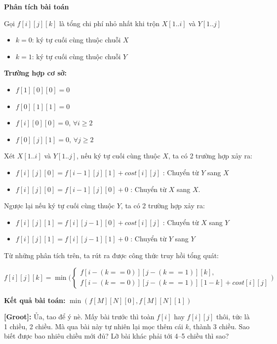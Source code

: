 \textbf{Phân tích bài toán}

Gọi $f[i][j][k]$ là tổng chi phí nhỏ nhất khi trộn $X[1..i]$ và $Y[1..j]$
\begin{itemize}
    \item $k = 0$: ký tự cuối cùng thuộc chuỗi $X$
    \item $k = 1$: ký tự cuối cùng thuộc chuỗi $Y$
\end{itemize} 

\textbf{Trường hợp cơ sở:}
\begin{itemize}
    \item $f[1][0][0] = 0$
    \item $f[0][1][1] = 0$
    \item $f[i][0][0] = 0$, $\forall i \geq 2$
    \item $f[0][j][1] = 0$, $\forall j \geq 2$
\end{itemize}

Xét $X[1..i]$ và $Y[1..j]$, nếu ký tự cuối cùng thuộc $X$, ta có 2 trường hợp xảy ra:

\begin{itemize}
    \item $f[i][j][0] = f[i - 1][j][1] + cost[i][j]$ : Chuyển từ $Y$ sang $X$ 
    \item $f[i][j][0] = f[i - 1][j][0] + 0$ : Chuyển từ $X$ sang $X$.
\end{itemize}
    
Ngược lại nếu ký tự cuối cùng thuộc $Y$, ta có 2 trường hợp xảy ra:
\begin{itemize}
    \item $f[i][j][1] = f[i][j - 1][0] + cost[i][j]$ : Chuyển từ $X$ sang $Y$
    \item $f[i][j][1] = f[i][j - 1][1] + 0$ : Chuyển từ $Y$ sang $Y$
\end{itemize}

Từ những phân tích trên, ta rút ra được công thức truy hồi tổng quát:


\[
f[i][j][k] = \min \Big( 
    \begin{cases}
        f[i - (k == 0)][j - (k == 1)][k], \\
        f[i - (k == 0)][j - (k == 1)][1 - k] + cost[i][j]
    \end{cases}
    \Big)
\]

\textbf{Kết quả bài toán:} $\min(f[M][N][0], f[M][N][1])$

\textbf{[Groot]:} Ủa, tao để ý nè. Mấy bài trước thì toàn $f[i]$ hay $f[i][j]$ thôi, 
tức là 1 chiều, 2 chiều. Mà qua bài này tự nhiên lại mọc thêm cái $k$, 
thành 3 chiều. Sao biết được bao nhiêu chiều mới đủ? 
Lỡ bài khác phải tới 4–5 chiều thì sao?\\

